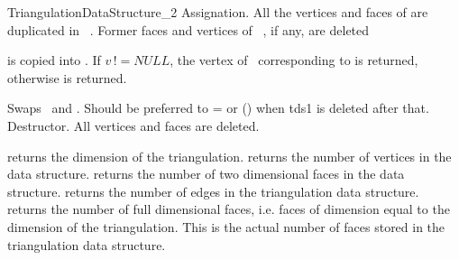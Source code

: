 \begin{ccRefConcept}{TriangulationDataStructure_2}
{Assignation. All the vertices and faces of  are duplicated
in \ccVar\ . Former faces and vertices of \ccVar\ , if any, are
deleted}


{ is copied into \ccVar. If $v\, !\!= NULL$, the vertex of \ccVar\ 
corresponding to  is returned, otherwise  
is returned.
}

{Swaps \ccVar\ and . Should be preferred to \ccVar= or \ccVar(\ccc{tds1})
when tds1 is deleted after that.}
\ccGlue
\ccModifierCrossRefOff
{}
{Destructor. All vertices and faces are deleted.}
\ccModifierCrossRefOff

\ccAccessFunctions
{}
{returns the dimension of the triangulation.}
\ccGlue
{}
{returns the number of vertices in the data structure.}
\ccGlue
{}
{returns the number of two dimensional faces in the data structure.}
\ccGlue
{}
{returns the number of edges  in the triangulation data structure.}
\ccGlue
{}
{returns the  number of full dimensional faces, 
i.e. faces of dimension equal to the dimension
of the triangulation. This is the actual
number of faces stored in the triangulation data structure.}

\begin{ccAdvanced}
\end{ccAdvanced}



\end{ccRefConcept}
